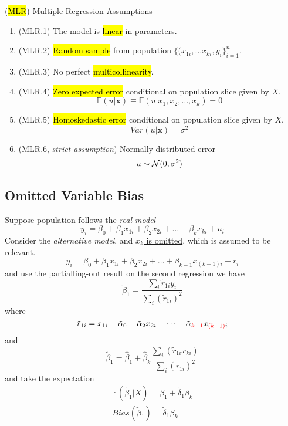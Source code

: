 \documentclass[]{article}
\begin{document}
    \begin{assumption}(\hl{MLR}) Multiple Regression Assumptions
        \begin{enumerate}
            \item (MLR.1) The model is \hl{linear} in parameters. 
            \item (MLR.2) \hl{Random sample} from population $\{(x_{1i}, \dots x_{ki}, y_i\}_{i=1}^n$.
            \item (MLR.3) No perfect \hl{multicollinearity}.
            \item (MLR.4) \hl{Zero expected error} conditional on population slice given by $X$.
            \[
                \mathbb{E}(u|\textbf{x}) \equiv \mathbb{E}(u|x_1, x_2, \dots, x_k) = 0
            \]
            \item (MLR.5) \hl{Homoskedastic error} conditional on population slice given by $X$.
            \[
                Var(u|\textbf{x}) = \sigma^2
            \]
            \item (MLR.6, \emph{strict assumption}) \ul{Normally distributed error}
            \[
                u \sim \mathcal{{N}}(0, \sigma^2)
            \]
        \end{enumerate}
    \end{assumption}
    
    \subsection{Omitted Variable Bias}
    \par Suppose population follows the \emph{real model} 
    \begin{equation}
        y_i = \beta_0 + \beta_1 x_{1i} + \beta_2 x_{2i} + \dots + \beta_k x_{ki} + u_i
    \end{equation}
    Consider the \emph{alternative model}, and \ul{$x_k$ is omitted}, which is assumed to be relevant.
    \begin{equation}
        y_i = \beta_0 + \beta_1 x_{1i} + \beta_2 x_{2i} + \dots + \beta_{k-1} x_{(k-1)i} + r_i
    \end{equation}
    and use the partialling-out result on the second regression we have
    \[
        \tilde{\beta}_1 = \frac{\sum_i \tilde{r}_{1i} y_i}{\sum_i(\tilde{r}_{1i})^2}
    \]
    where 
    \[
    	\tilde{r}_{1i} = x_{1i} - \tilde{\alpha}_0 - \tilde{\alpha}_2 x_{2i} - \dots - \tilde{\alpha}_{\textcolor{red}{k-1}}x_{\textcolor{red}{(k-1)}i}
    \]
    and
    \begin{equation}
        \tilde{\beta}_1 = \hat{\beta}_1 + \hat{\beta}_k \frac{\sum_i (\tilde{r}_{1i} x_{ki})}{\sum_i (\tilde{r}_{1i})^2}
    \end{equation}
    and take the expectation 
    \begin{gather*}
        \mathbb{E}(\tilde{\beta}_1 | X) = \beta_1 + \tilde{\delta}_1 \beta_k \\
        Bias(\tilde{\beta}_1) = \tilde{\delta}_1 \beta_k
    \end{gather*}
\end{document}
